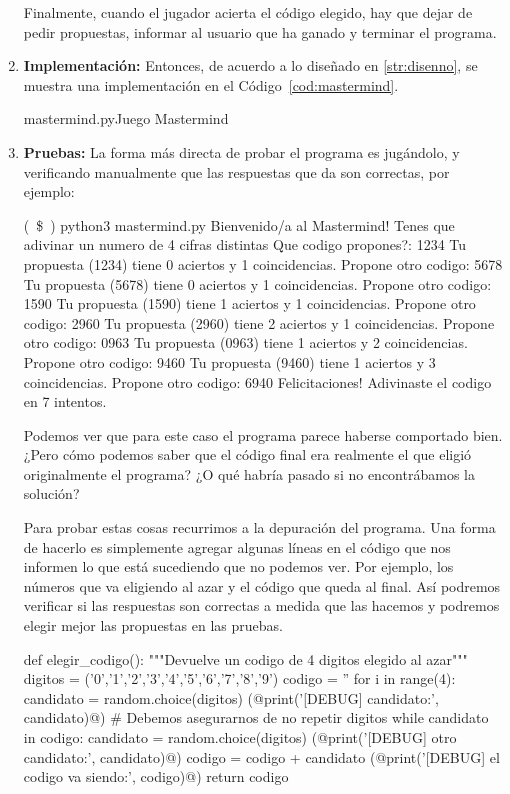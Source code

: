 \begin{enumerate}
Finalmente, cuando el jugador acierta el código elegido, hay que dejar de pedir
propuestas, informar al usuario que ha ganado y terminar el programa.

\item {\bf Implementación:}
Entonces, de acuerdo a lo diseñado en \ref{str:disenno}, se muestra una
implementación en el Código~\ref{cod:mastermind}.

\begin{codigo}{\label{cod:mastermind} mastermind.py}{Juego Mastermind}

\end{codigo}

\item {\bf Pruebas:}
La forma más directa de probar el programa es jugándolo, y verificando
manualmente que las respuestas que da son correctas, por ejemplo:

\begin{codigo-nohl-sn}
(~\$~) python3 mastermind.py
Bienvenido/a al Mastermind!
Tenes que adivinar un numero de 4 cifras distintas
Que codigo propones?: 1234
Tu propuesta (1234) tiene 0 aciertos y  1 coincidencias.
Propone otro codigo: 5678
Tu propuesta (5678) tiene 0 aciertos y  1 coincidencias.
Propone otro codigo: 1590
Tu propuesta (1590) tiene 1 aciertos y  1 coincidencias.
Propone otro codigo: 2960
Tu propuesta (2960) tiene 2 aciertos y  1 coincidencias.
Propone otro codigo: 0963
Tu propuesta (0963) tiene 1 aciertos y  2 coincidencias.
Propone otro codigo: 9460
Tu propuesta (9460) tiene 1 aciertos y  3 coincidencias.
Propone otro codigo: 6940
Felicitaciones! Adivinaste el codigo en 7 intentos.
\end{codigo-nohl-sn}

Podemos ver que para este caso el programa parece haberse comportado bien.
¿Pero cómo podemos saber que el código final era realmente el que eligió
originalmente el programa? ¿O qué habría pasado si no encontrábamos la
solución?

Para probar estas cosas recurrimos a la depuración del programa. Una forma
de hacerlo es simplemente agregar algunas líneas en el código que nos
informen lo que está sucediendo que no podemos ver. Por ejemplo, los
números que va eligiendo al azar y el código que queda al final. Así
podremos verificar si las respuestas son correctas a medida que las hacemos
y podremos elegir mejor las propuestas en las pruebas.

\begin{codigo-python-sn}
def elegir_codigo():
    """Devuelve un codigo de 4 digitos elegido al azar"""
    digitos = ('0','1','2','3','4','5','6','7','8','9')
    codigo = ''
    for i in range(4):
        candidato = random.choice(digitos)
        (@print('[DEBUG] candidato:', candidato)@)
        # Debemos asegurarnos de no repetir digitos
        while candidato in codigo:
            candidato = random.choice(digitos)
            (@print('[DEBUG] otro candidato:', candidato)@)
        codigo = codigo + candidato
        (@print('[DEBUG] el codigo va siendo:', codigo)@)
    return codigo
\end{codigo-python-sn}


\end{enumerate}

